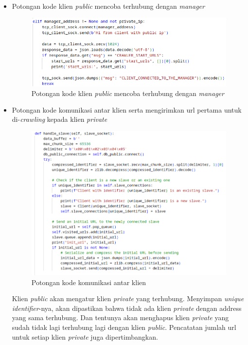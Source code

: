 \begin{itemize}
	\item{Potongan kode klien \emph{public} mencoba terhubung dengan \emph{manager}}
	\begin{figure}[H]
		\centering{}
		\includegraphics[width=1\textwidth]{gambar/kode/potongan_client_10}
		\caption{Potongan kode klien \emph{public} mencoba terhubung dengan \emph{manager}}
	\end{figure}
	\clearpage

	\item{Potongan kode komunikasi antar klien serta mengirimkan url pertama untuk di-\emph{crawling} kepada klien \emph{private}}
	\begin{figure}[H]
		\centering{}
		\includegraphics[width=1\textwidth]{gambar/kode/potongan_client_04}
		\caption{Potongan kode komunikasi antar klien}
	\end{figure}
	Klien \emph{public} akan mengatur klien \emph{private} yang terhubung. Menyimpan \emph{unique identifier}-nya, akan dipastikan bahwa tidak ada klien \emph{private} dengan address yang sama terhubung. Dan tentunya akan menghapus klien \emph{private} yang sudah tidak lagi terhubung lagi dengan klien \emph{public}. Pencatatan jumlah url untuk setiap klien \emph{private} juga dipertimbangkan.
	

\end{itemize}
